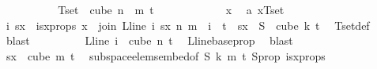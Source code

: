 \begin{isabellebody}
\isanewline
\isanewline
\ \ \ \ \isamarkupfalse%
\isanewline
\ \ \ \ \isamarkupfalse%
\ {\isachardoublequoteopen}Tset\ {\isasymsubseteq}\ cube\ {\isacharparenleft}{\kern0pt}n\ {\isacharplus}{\kern0pt}\ m{\isacharparenright}{\kern0pt}\ {\isacharparenleft}{\kern0pt}t{\isacharplus}{\kern0pt}{}{\isacharparenright}{\kern0pt}{\isachardoublequoteclose}\isanewline
\ \ \ \ \isamarkupfalse%
\isanewline
\ \ \ \ \ \ \isamarkupfalse%
\ x\ \isamarkupfalse%
\ a{\isacharcolon}{\kern0pt}\ {\isachardoublequoteopen}x{\isasymin}Tset{\isachardoublequoteclose}\isanewline
\ \ \ \ \ \ \isamarkupfalse%
\ \isamarkupfalse%
\ i\ sx\ \ isx{\isacharunderscore}{\kern0pt}props{\isacharcolon}{\kern0pt}\ {\isachardoublequoteopen}x\ {\isacharequal}{\kern0pt}\ join\ {\isacharparenleft}{\kern0pt}L{\isacharunderscore}{\kern0pt}line\ i{\isacharparenright}{\kern0pt}\ sx\ n\ m\ {\isasymand}\ i\ {\isasymin}\ {\isacharbraceleft}{\kern0pt}{\isachardot}{\kern0pt}{\isachardot}{\kern0pt}{\isacharless}{\kern0pt}t{\isacharplus}{\kern0pt}{}{\isacharbraceright}{\kern0pt}\ {\isasymand}\ sx\ {\isasymin}\ S\ {\isacharbackquote}{\kern0pt}\ {\isacharparenleft}{\kern0pt}cube\ k\ {\isacharparenleft}{\kern0pt}t{\isacharplus}{\kern0pt}{}{\isacharparenright}{\kern0pt}{\isacharparenright}{\kern0pt}{\isachardoublequoteclose}\ \isamarkupfalse%
\ Tset{\isacharunderscore}{\kern0pt}def\ \isamarkupfalse%
\ blast\isanewline
\ \ \ \ \ \ \isamarkupfalse%
\ \isamarkupfalse%
\ {\isachardoublequoteopen}L{\isacharunderscore}{\kern0pt}line\ i\ {\isasymin}\ cube\ n\ {\isacharparenleft}{\kern0pt}t{\isacharplus}{\kern0pt}{}{\isacharparenright}{\kern0pt}{\isachardoublequoteclose}\ \isamarkupfalse%
\ L{\isacharunderscore}{\kern0pt}line{\isacharunderscore}{\kern0pt}base{\isacharunderscore}{\kern0pt}prop\ \isamarkupfalse%
\ blast\isanewline
\ \ \ \ \ \ \isamarkupfalse%
\ \isamarkupfalse%
\ {\isachardoublequoteopen}sx\ {\isasymin}\ cube\ m\ {\isacharparenleft}{\kern0pt}t{\isacharplus}{\kern0pt}{}{\isacharparenright}{\kern0pt}{\isachardoublequoteclose}\ \isamarkupfalse%
\ subspace{\isacharunderscore}{\kern0pt}elems{\isacharunderscore}{\kern0pt}embed{\isacharbrackleft}{\kern0pt}of\ {\isachardoublequoteopen}S{\isachardoublequoteclose}\ {\isachardoublequoteopen}k{\isachardoublequoteclose}\ {\isachardoublequoteopen}m{\isachardoublequoteclose}\ {\isachardoublequoteopen}t{\isacharplus}{\kern0pt}{}{\isachardoublequoteclose}{\isacharbrackright}{\kern0pt}\ S{\isacharunderscore}{\kern0pt}prop\ isx{\isacharunderscore}{\kern0pt}props\ \isamarkupfalse%

\end{isabellebody}
